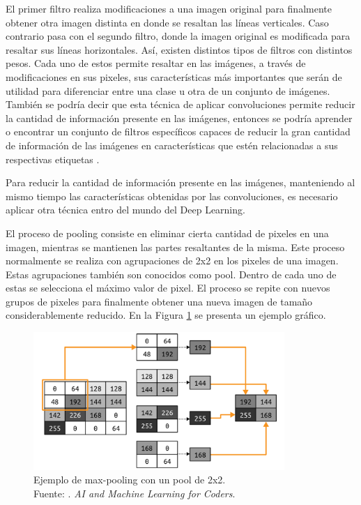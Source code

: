 El primer filtro realiza modificaciones a una imagen original para finalmente obtener otra imagen distinta en donde se resaltan las líneas verticales. Caso contrario pasa con el segundo filtro, donde la imagen original es modificada para resaltar sus líneas horizontales. Así, existen distintos tipos de filtros con distintos pesos. Cada uno de estos permite resaltar en las imágenes, a través de modificaciones en sus pixeles, sus características más importantes que serán de utilidad para diferenciar entre una clase u otra de un conjunto de imágenes. También se podría decir que esta técnica de aplicar convoluciones permite reducir la cantidad de información presente en las imágenes, entonces se podría aprender o encontrar un conjunto de filtros específicos capaces de reducir la gran cantidad de información de las imágenes en características que estén relacionadas a sus respectivas etiquetas \parencite{bk_moroney2020aiandml}.

Para reducir la cantidad de información presente en las imágenes, manteniendo al mismo tiempo las características obtenidas por las convoluciones, es necesario aplicar otra técnica entro del mundo del Deep Learning.

El proceso de pooling consiste en eliminar cierta cantidad de pixeles en una imagen, mientras se mantienen las partes resaltantes de la misma. Este proceso normalmente se realiza con agrupaciones de 2x2 en los pixeles de una imagen. Estas agrupaciones también son conocidos como pool. Dentro de cada uno de estas se selecciona el máximo valor de pixel. El proceso se repite con nuevos grupos de pixeles para finalmente obtener una nueva imagen de tamaño considerablemente reducido. \parencite{bk_moroney2020aiandml} En la Figura \ref{2:fig204} se presenta un ejemplo gráfico.

\begin{figure}[H]
	\begin{center}
		\includegraphics[width=0.85\textwidth]{2/figures/cnn_pool_examp.png}
		\caption[Ejemplo de max-pooling con un pool de 2x2]{Ejemplo de max-pooling con un pool de 2x2. \\
		Fuente: \cite{bk_moroney2020aiandml}. \textit{AI and Machine Learning for Coders}.}
		\label{2:fig204}
	\end{center}
\end{figure}

